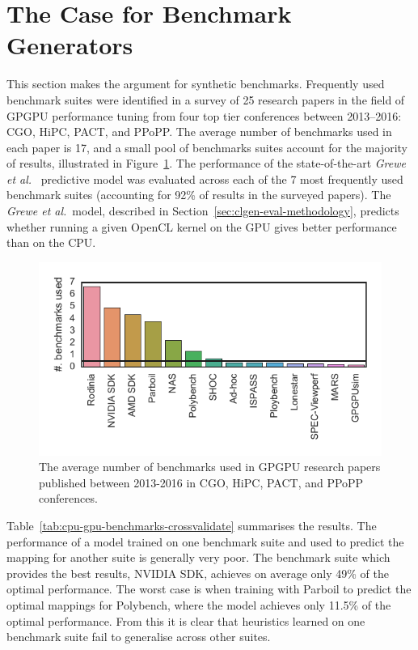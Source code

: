 \section{The Case for Benchmark Generators}%
\label{sec:the-case-for-benchmark-generators}

This section makes the argument for synthetic benchmarks. Frequently used benchmark suites were identified in a survey of 25 research papers in the field of GPGPU performance tuning from four top tier conferences between 2013--2016: CGO, HiPC, PACT, and PPoPP. The average number of benchmarks used in each paper is 17, and a small pool of benchmarks suites account for the majority of results, illustrated in Figure~\ref{fig:benchmark-suite-distribution}. The performance of the state-of-the-art \emph{Grewe et   al.}~\cite{Grewe2013} predictive model was evaluated across each of the 7 most frequently used benchmark suites (accounting for 92\% of results in the surveyed papers). The \emph{Grewe et   al.}~model, described in Section~\ref{sec:clgen-eval-methodology}, predicts whether running a given OpenCL kernel on the GPU gives better performance than on the CPU.

\begin{figure}[t]
	\includegraphics[width=\columnwidth]{img/motivation-c} %
	\caption[Benchmark counts in GPGPU research papers]{%
		The average number of benchmarks used in GPGPU research papers published between 2013-2016 in CGO, HiPC, PACT, and PPoPP conferences.%
	}%
	\label{fig:benchmark-suite-distribution}
\end{figure}

Table~\ref{tab:cpu-gpu-benchmarks-crossvalidate} summarises the results. The performance of a model trained on one benchmark suite and used to predict the mapping for another suite is generally very poor. The benchmark suite which provides the best results, NVIDIA SDK, achieves on average only 49\% of the optimal performance. The worst case is when training with Parboil to predict the optimal mappings for Polybench, where the model achieves only 11.5\% of the optimal performance. From this it is clear that heuristics learned on one benchmark suite fail to generalise across other suites.

